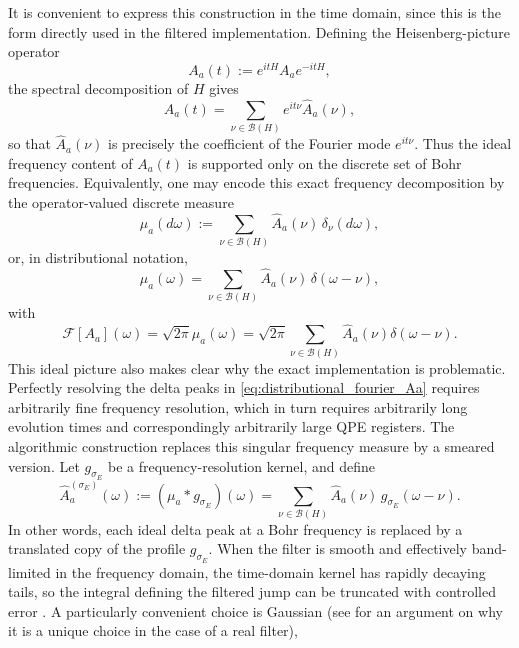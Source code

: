 \documentclass[showpacs,amsmath,amssymb,twocolumn,prx,superscriptaddress,10pt,aps,nofootinbib]{revtex4-2}
\begin{document}
It is convenient to express this construction in the time domain, since this is the form directly used in the filtered implementation. Defining the Heisenberg-picture operator
\begin{equation}
A_a(t):=e^{itH}A_ae^{-itH},
\end{equation}
the spectral decomposition of $H$ gives
\begin{equation}
A_a(t)=\sum_{\nu\in\mathcal{B}(H)} e^{it\nu}\hat A_a(\nu),
\end{equation}
so that $\hat A_a(\nu)$ is precisely the coefficient of the Fourier mode $e^{it\nu}$. 
Thus the ideal frequency content of $A_a(t)$ is supported only on the discrete set of Bohr frequencies. Equivalently, one may encode this exact frequency decomposition by the operator-valued discrete measure
\begin{equation}
\mu_a(d\omega)
:=
\sum_{\nu\in\mathcal B(H)} \hat A_a(\nu)\,\delta_\nu(d\omega),
\end{equation}
or, in distributional notation,
\begin{equation}
\label{eq:distributional_fourier_Aa}
\mu_a(\omega)
=
\sum_{\nu\in\mathcal B(H)} \hat A_a(\nu)\,\delta(\omega-\nu),
\end{equation}
with
\begin{equation}
  \mathcal{F}\left[A_a\right](\omega)=\sqrt{2 \pi} \mu_a(\omega)=\sqrt{2 \pi} \sum_{\nu \in \mathcal{B}(H)} \hat{A}_a(\nu) \delta(\omega-\nu) .  
\end{equation}
This ideal picture also makes clear why the exact implementation is problematic. Perfectly resolving the delta peaks in \eqref{eq:distributional_fourier_Aa} requires arbitrarily fine frequency resolution, which in turn requires arbitrarily long evolution times and correspondingly arbitrarily large QPE registers. The algorithmic construction replaces this singular frequency measure by a smeared version. Let $g_{\sigma_E}$ be a frequency-resolution kernel, and define
\begin{equation}
\label{eq:smeared_jump_measure}
\hat A_a^{(\sigma_E)}(\omega)
:=
(\mu_a*g_{\sigma_E})(\omega)
=
\sum_{\nu\in\mathcal B(H)} \hat A_a(\nu)\,g_{\sigma_E}(\omega-\nu).
\end{equation}
In other words, each ideal delta peak at a Bohr frequency is replaced by a translated copy of the profile $g_{\sigma_E}$. When the filter is smooth and effectively band-limited in the frequency domain, the time-domain kernel has rapidly decaying tails, so the integral defining the filtered jump can be truncated with controlled error \cite{Ding2024}. A particularly convenient choice is Gaussian (see \cite[App.D]{Chen2023b} for an argument on why it is a unique choice in the case of a real filter),
\end{document}
